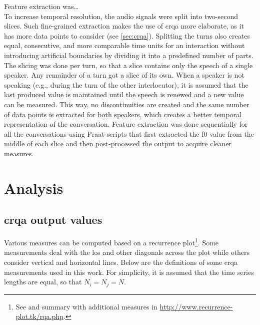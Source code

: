 Feature extraction was\ldots\\
To increase temporal resolution, the audio signals were split into two-second slices.
Such fine-grained extraction makes the use of \ac{crqa} more elaborate, as it has more data points to consider (see \cref{sec:crqa}).
Splitting the turns also creates equal, consecutive, and more comparable time units for an interaction without introducing artificial boundaries by dividing it into a predefined number of parts.
The slicing was done per turn, so that a slice contains only the speech of a single speaker.
Any remainder of a turn got a slice of its own.
When a speaker is not speaking (e.g., during the turn of the other interlocutor), it is assumed that the last produced value is maintained until the speech is renewed and a new value can be measured.
This way, no discontinuities are created and the same number of data points is extracted for both speakers, which creates a better temporal representation of the conversation.
Feature extraction was done sequentially for all the conversations using Praat \citep{Boersma2001praat} scripts that first extracted the \ac{f0} value from the middle of each slice and then post-processed the output to acquire cleaner measures.

\section{Analysis}
\label{sec:analysis}


\subsection{\Acs{crqa} output values}
\label{subsec:output_values}

Various measures can be computed based on a recurrence plot\footnote{See \citet{Marwan2007recurrence} and summary with additional measures in \url{http://www.recurrence-plot.tk/rqa.php}.}.
Some measurements deal with the \ac{los} and other diagonals across the plot while others consider vertical and horizontal lines.
Below are the definitions of some \ac{crqa} measurements used in this work.
For simplicity, it is assumed that the time series lengths are equal, so that $N_i=N_j=N$.

